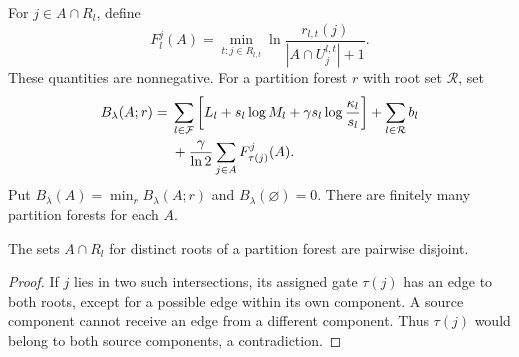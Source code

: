 For $j\in A\cap R_l$, define
\[
 F_l^j(A)=\min_{t:j\in R_{l,t}}
 \ln\frac{r_{l,t}(j)}{|A\cap U_j^{l,t}|+1}.
\]
These quantities are nonnegative. For a partition forest $r$ with root set $\mathcal R$, set
\begin{align}
 B_\lambda(A;r)={}&
 \sum_{l\in\mathcal F}\left[
 L_l+s_l\log M_l+\gamma s_l\log\frac{\kappa_l}{s_l}\right]
 +\sum_{l\in\mathcal R}b_l\notag\\
 &+\frac{\gamma}{\ln2}\sum_{j\in A}F_{\tau(j)}^j(A).\label{eq:forestcost}
\end{align}
Put $B_\lambda(A)=\min_r B_\lambda(A;r)$ and $B_\lambda(\varnothing)=0$. There are finitely many partition forests for each $A$.

\begin{lemma}\label{lem:forestrootdisjoint}
The sets $A\cap R_l$ for distinct roots of a partition forest are pairwise disjoint.
\end{lemma}
\begin{proof}
If $j$ lies in two such intersections, its assigned gate $\tau(j)$ has an edge to both roots, except for a possible edge within its own component. A source component cannot receive an edge from a different component. Thus $\tau(j)$ would belong to both source components, a contradiction.
\end{proof}

